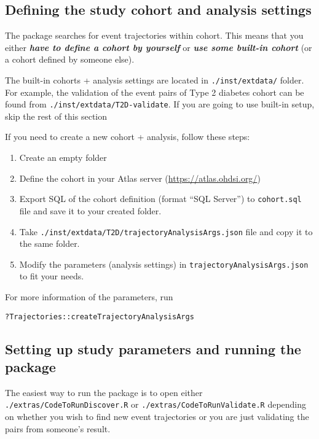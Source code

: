 \documentclass[
]{article}
\providecommand{\tightlist}{%
  \setlength{\itemsep}{0pt}\setlength{\parskip}{0pt}}
\begin{document}
\hypertarget{defining-the-study-cohort-and-analysis-settings}{%
\subsection{Defining the study cohort and analysis
settings}\label{defining-the-study-cohort-and-analysis-settings}}

The package searches for event trajectories within cohort. This means
that you either \textbf{\emph{have to define a cohort by yourself}} or
\textbf{\emph{use some built-in cohort}} (or a cohort defined by someone
else).

The built-in cohorts + analysis settings are located in
\texttt{./inst/extdata/} folder. For example, the validation of the
event pairs of Type 2 diabetes cohort can be found from
\texttt{./inst/extdata/T2D-validate}. If you are going to use built-in
setup, skip the rest of this section

If you need to create a new cohort + analysis, follow these steps:

\begin{enumerate}
\def\labelenumi{\arabic{enumi}.}
\tightlist
\item
  Create an empty folder
\item
  Define the cohort in your Atlas server
  (\url{https://atlas.ohdsi.org/})
\item
  Export SQL of the cohort definition (format ``SQL Server'') to
  \texttt{cohort.sql} file and save it to your created folder.
\item
  Take \texttt{./inst/extdata/T2D/trajectoryAnalysisArgs.json} file and
  copy it to the same folder.
\item
  Modify the parameters (analysis settings) in
  \texttt{trajectoryAnalysisArgs.json} to fit your needs.
\end{enumerate}

For more information of the parameters, run

\texttt{?Trajectories::createTrajectoryAnalysisArgs}

\hypertarget{setting-up-study-parameters-and-running-the-package}{%
\subsection{Setting up study parameters and running the
package}\label{setting-up-study-parameters-and-running-the-package}}

The easiest way to run the package is to open either
\texttt{./extras/CodeToRunDiscover.R} or
\texttt{./extras/CodeToRunValidate.R} depending on whether you wish to
find new event trajectories or you are just validating the pairs from
someone's result.
\end{document}

